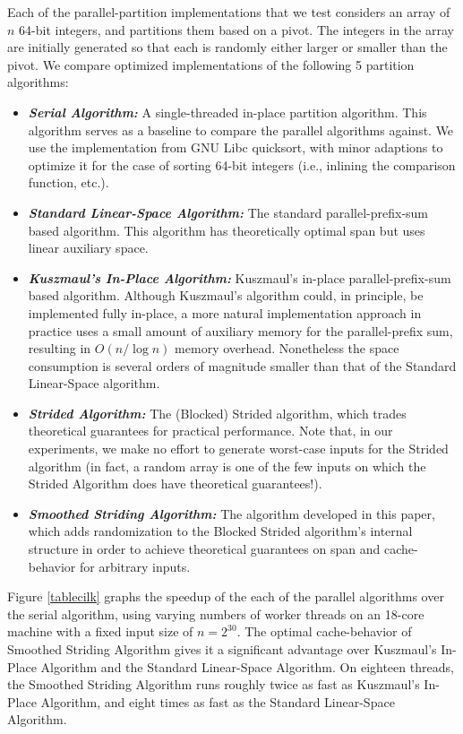 \documentclass[11pt]{article}
\newcommand{\defn}[1]{{\textit{\textbf{\boldmath #1}}}}
\renewcommand{\paragraph}[1]{\vspace{0.09in}\noindent{\bf \boldmath #1.}}
\theoremstyle{remark}
\theoremstyle{remark}
\begin{document}
Each of the parallel-partition implementations that we test considers
an array of $n$ 64-bit integers, and partitions them based on a
pivot. The integers in the array are initially generated so that each
is randomly either larger or smaller than the pivot. We compare
optimized implementations of the following 5 partition algorithms:
\begin{itemize}
\item \defn{Serial Algorithm:} A single-threaded in-place partition
  algorithm. This algorithm serves as a baseline to 
  compare the parallel algorithms against. We use the implementation from GNU
  Libc quicksort, with minor adaptions to optimize it for the case of
  sorting 64-bit integers (i.e., inlining the comparison function,
  etc.).
\item \defn{Standard Linear-Space Algorithm:} The standard
  parallel-prefix-sum based algorithm. This algorithm has
  theoretically optimal span but uses linear auxiliary space.
\item \defn{Kuszmaul's In-Place Algorithm:} Kuszmaul's in-place
  parallel-prefix-sum based algorithm. Although Kuszmaul's algorithm
  could, in principle, be implemented fully in-place, a more natural
  implementation approach in practice uses a small amount of auxiliary
  memory for the parallel-prefix sum, resulting in $O(n / \log n)$
  memory overhead. Nonetheless the space consumption is several orders
  of magnitude smaller than that of the Standard Linear-Space
  algorithm.
\item \defn{Strided Algorithm:} The (Blocked) Strided algorithm, which
  trades theoretical guarantees for practical performance. Note that,
  in our experiments, we make no effort to generate worst-case inputs
  for the Strided algorithm (in fact, a random array is one of the few
  inputs on which the Strided Algorithm does have theoretical
  guarantees!).
\item \defn{Smoothed Striding Algorithm:} The algorithm developed in
  this paper, which adds randomization to the Blocked Strided
  algorithm's internal structure in order to achieve theoretical
  guarantees on span and cache-behavior for arbitrary inputs.
\end{itemize}

\paragraph{Comparing running times in parallel and serial}
Figure \ref{tablecilk} graphs the speedup of the each of the parallel
algorithms over the serial algorithm, using varying numbers of worker
threads on an 18-core machine with a fixed input size of $n =
2^{30}$. The optimal cache-behavior of Smoothed Striding Algorithm
gives it a significant advantage over Kuszmaul's In-Place Algorithm
and the Standard Linear-Space Algorithm. On eighteen threads, the
Smoothed Striding Algorithm runs roughly twice as fast as Kuszmaul's
In-Place Algorithm, and eight times as fast as the Standard
Linear-Space Algorithm.
\end{document}
